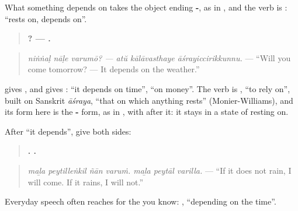 \begin{grammarlens}[title={Grammar Lens: \ml{ആശ്രയിച്ചിരിക്കുന്നു}}]
What something depends on takes the object ending \textbf{-}, as in \textbf{}, and the verb is \textbf{}: \textquotedblleft{}rests on, depends on\textquotedblright{}.

\begin{quote}
\textbf{  ? —   .}
\end{quote}

\begin{quote}
\emph{niṅṅaḷ nāḷe varumō? — atŭ kālāvasthaye āśrayiccirikkunnu.} — \textquotedblleft{}Will you come tomorrow? — It depends on the weather.\textquotedblright{}
\end{quote}

\textbf{} gives \textbf{}, and \textbf{} gives \textbf{}: \textquotedblleft{}it depends on time\textquotedblright{}, \textquotedblleft{}on money\textquotedblright{}. The verb is \textbf{}, \textquotedblleft{}to rely on\textquotedblright{}, built on Sanskrit \emph{āśraya}, \textquotedblleft{}that on which anything rests\textquotedblright{} (Monier-Williams), and its form here is the \textbf{-} form, as in \textbf{}, with \textbf{} after it: it stays in a state of resting on.
\end{grammarlens}

\begin{grammarlens}[title={Grammar Lens: then both outcomes}]
After \textquotedblleft{}it depends\textquotedblright{}, give both sides:

\begin{quote}
\textbf{   .   .}
\end{quote}

\begin{quote}
\emph{maḻa peytilleṅkil ñān varuṁ. maḻa peytāl varilla.} — \textquotedblleft{}If it does not rain, I will come. If it rains, I will not.\textquotedblright{}
\end{quote}

Everyday speech often reaches for the \textbf{} you know: \textbf{ }, \textquotedblleft{}depending on the time\textquotedblright{}.
\end{grammarlens}


